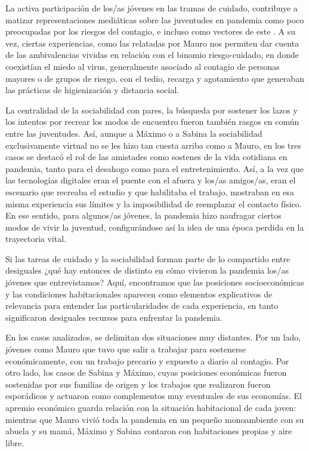 \begin{refsection}
La activa participación de los/as jóvenes en las tramas de cuidado, contribuye a matizar representaciones mediáticas sobre las juventudes en pandemia como poco preocupadas por los riesgos del contagio, e incluso como vectores de este \protect\parencite{4238-NAVARRO2022}. A su vez, ciertas experiencias, como las relatadas por Mauro nos permiten dar cuenta de las ambivalencias vividas en relación con el binomio riesgo-cuidado, en donde coexistían el miedo al virus, generalmente asociado al contagio de personas mayores o de grupos de riesgo, con el tedio, recarga y agotamiento que generaban las prácticas de higienización y distancia social.

La centralidad de la sociabilidad con pares, la búsqueda por sostener los lazos y los intentos por recrear los modos de encuentro fueron también rasgos en común entre las juventudes. Así, aunque a Máximo o a Sabina la sociabilidad exclusivamente virtual no se les hizo tan cuesta arriba como a Mauro, en los tres casos se destacó el rol de las amistades como sostenes de la vida cotidiana en pandemia, tanto para el desahogo como para el entretenimiento. Así, a la vez que las tecnologías digitales eran el puente con el afuera y los/as amigos/as, eran el escenario que recreaba el estudio y que habilitaba el trabajo, mostraban en esa misma experiencia sus límites y la imposibilidad de reemplazar el contacto físico. En ese sentido, para algunos/as jóvenes, la pandemia hizo naufragar ciertos modos de vivir la juventud, configurándose así la idea de una época perdida en la trayectoria vital.

Si las tareas de cuidado y la sociabilidad forman parte de lo compartido entre desiguales ¿qué hay entonces de distinto en cómo vivieron la pandemia los/as jóvenes que entrevistamos? Aquí, encontramos que las posiciones socioeconómicas y las condiciones habitacionales aparecen como elementos explicativos de relevancia para entender las particularidades de cada experiencia, en tanto significaron desiguales recursos para enfrentar la pandemia.

En los casos analizados, se delimitan dos situaciones muy distantes. Por un lado, jóvenes como Mauro que tuvo que salir a trabajar para sostenerse económicamente, con un trabajo precario y expuesto a diario al contagio. Por otro lado, los casos de Sabina y Máximo, cuyas posiciones económicas fueron sostenidas por sus familias de origen y los trabajos que realizaron fueron esporádicos y actuaron como complementos muy eventuales de sus economías. El apremio económico guarda relación con la situación habitacional de cada joven: mientras que Mauro vivió toda la pandemia en un pequeño monoambiente con su abuela y su mamá, Máximo y Sabina contaron con habitaciones propias y aire libre.


\end{refsection}
